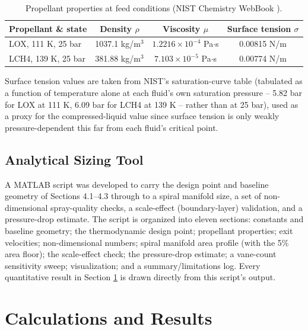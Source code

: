 \documentclass[11pt,a4paper]{article}
\begin{document}
\begin{table}[h]
\centering
\caption{Propellant properties at feed conditions (NIST Chemistry WebBook \cite{nist_webbook}).}
\label{tab:propellant-props}
\begin{tabular}{@{}lccc@{}}
\toprule
Propellant \& state & Density $\rho$ & Viscosity $\mu$ & Surface tension $\sigma$ \\
\midrule
LOX, 111 K, 25 bar & 1037.1 kg/m$^3$ & $1.2216\times10^{-4}$ Pa$\cdot$s & 0.00815 N/m \\
LCH4, 139 K, 25 bar & 381.88 kg/m$^3$ & $7.103\times10^{-5}$ Pa$\cdot$s & 0.00774 N/m \\
\bottomrule
\end{tabular}
\end{table}

Surface tension values are taken from NIST's saturation-curve table (tabulated as a function of temperature alone at each fluid's own saturation pressure -- 5.82 bar for LOX at 111 K, 6.09 bar for LCH4 at 139 K -- rather than at 25 bar), used as a proxy for the compressed-liquid value since surface tension is only weakly pressure-dependent this far from each fluid's critical point.

\subsection{Analytical Sizing Tool}

A MATLAB script was developed to carry the design point and baseline geometry of Sections 4.1--4.3 through to a spiral manifold size, a set of non-dimensional spray-quality checks, a scale-effect (boundary-layer) validation, and a pressure-drop estimate. The script is organized into eleven sections: constants and baseline geometry; the thermodynamic design point; propellant properties; exit velocities; non-dimensional numbers; spiral manifold area profile (with the 5\% area floor); the scale-effect check; the pressure-drop estimate; a vane-count sensitivity sweep; visualization; and a summary/limitations log. Every quantitative result in Section \ref{sec:results} is drawn directly from this script's output.

\section{Calculations and Results}
\label{sec:results}
\end{document}
